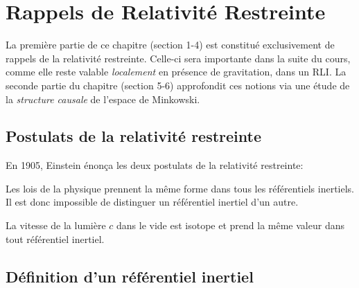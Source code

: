 \chapter{Rappels de Relativité Restreinte}
La première partie de ce chapitre (section 1-4) est constitué exclusivement de rappels de la relativité restreinte. Celle-ci sera importante dans la suite du cours, comme elle reste valable \emph{localement} en présence de gravitation, dans un RLI. La seconde partie du chapitre (section 5-6) approfondit ces notions via une étude de la \emph{structure causale} de l'espace de Minkowski.


\section{Postulats de la relativité restreinte}
En 1905, Einstein énonça les deux postulats de la relativité restreinte:
\begin{theoremframe}
    \begin{post}
        Les lois de la physique prennent la même forme dans tous les référentiels inertiels. Il est donc impossible de distinguer un référentiel inertiel d'un autre.
    \end{post}
\end{theoremframe}
\begin{theoremframe}
    \begin{post}
        La vitesse de la lumière $c$ dans le vide est isotope et prend la même valeur dans tout référentiel inertiel.
    \end{post}
\end{theoremframe}
\section{Définition d'un référentiel inertiel}

